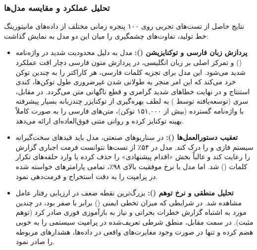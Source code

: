 \documentclass[a4paper, 10pt, twocolumn]{article}
\begin{document}
	\subsubsection{تحلیل عملکرد و مقایسه مدل‌ها}
	
	نتایج حاصل از تست‌های تجربی روی ۱۰۰ پنجره زمانی مختلف از داده‌های مانیتورینگ خط تولید، تفاوت‌های چشمگیری را میان این دو مدل به نمایش گذاشت:
	
	\begin{itemize}
		\item \textbf{پردازش زبان فارسی و توکنایزیشن ():} 
		مدل  به دلیل محدودیت شدید در واژه‌نامه () و تمرکز اصلی بر زبان انگلیسی، در پردازش متون فارسی دچار افت عملکرد شدید می‌شود. این مدل برای تجزیه کلمات فارسی، هر کاراکتر را به چندین توکن خرد می‌کند که این امر منجر به طولانی شدن غیرضروری طول توکن‌ها، کندی استنتاج و در نهایت خطاهای شدید گرامری و قطع ناگهانی متن می‌گردد. در مقابل، سری  (توسعه‌یافته توسط ) به لطف بهره‌گیری از توکنایزر چندزبانه بسیار پیشرفته با واژه‌نامه گسترده (بیش از ۱۵۱,۰۰۰ توکن)، متن‌های فارسی را به صورت کاملاً بهینه توکنایز کرده و روانی متنی فوق‌العاده‌ای ارائه می‌دهد.
		
		\item \textbf{تعقیب دستورالعمل‌ها ():}
		در سناریوهای صنعتی، مدل باید قیدهای سخت‌گیرانه سیستم فازی و  را درک کند. مدل  در ۵۴٪ از تست‌ها نتوانست فرمت اجباری گزارش را رعایت کند و غالباً بخش «اقدام پیشنهادی» را حذف کرده یا وارد حلقه‌های تکرار کلمات () شد. اما مدل  با نرخ موفقیت بالای ۹۸٪، تمامی پارامترهای خواسته شده در پرامپت را به دقت استخراج و فرمت‌دهی نمود.
		
		\item \textbf{تحلیل منطقی و نرخ توهم ():}
		بزرگ‌ترین نقطه ضعف  در ارزیابی رفتار عامل  مشاهده شد. در شرایطی که میزان تخطی ایمنی () برابر با صفر بود،  در چندین مورد به اشتباه گزارش خطرات بحرانی و نیاز به بازآموزی فوری صادر کرد (توهم مثبت). در سمت مقابل، منطق شرطی تعریف‌شده در پرامپت سیستمی را به خوبی هضم کرده و تنها در صورت وجود مغایرت‌های واقعی در داده‌ها، هشدارهای مربوطه را صادر نمود.
	\end{itemize}
	
\end{document}
